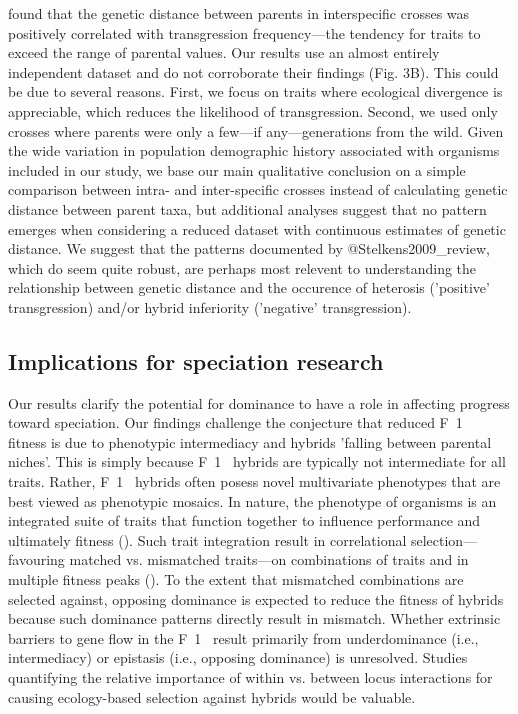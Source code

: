\documentclass[times, twoside, watermark]{zHenriquesLab-StyleBioRxiv}
\begin{document}
\cite{Stelkens2009_review} found that the genetic distance between parents in interspecific crosses was positively correlated with transgression frequency---the tendency for traits to exceed the range of parental values. Our results use an almost entirely independent dataset and do not corroborate their findings (Fig. 3B). This could be due to several reasons. First, we focus on traits where ecological divergence is appreciable, which reduces the likelihood of transgression. Second, we used only crosses where parents were only a few---if any---generations from the wild. Given the wide variation in population demographic history associated with organisms included in our study, we base our main qualitative conclusion on a simple comparison between intra- and inter-specific crosses instead of calculating genetic distance between parent taxa, but additional analyses suggest that no pattern emerges when considering a reduced dataset with continuous estimates of genetic distance. We suggest that the patterns documented by @Stelkens2009_review, which do seem quite robust, are perhaps most relevent to understanding the relationship between genetic distance and the occurence of heterosis ('positive' transgression) and/or hybrid inferiority ('negative' transgression).\par

\subsection*{Implications for speciation research}
Our results clarify the potential for dominance to have a role in affecting progress toward speciation. Our findings challenge the conjecture that reduced F~1~ fitness is due to phenotypic intermediacy and hybrids 'falling between parental niches'. This is simply because F~1~ hybrids are typically not intermediate for all traits. Rather, F~1~ hybrids often posess novel multivariate phenotypes that are best viewed as phenotypic mosaics. In nature, the phenotype of organisms is an integrated suite of traits that function together to influence performance and ultimately fitness (\citealt{Arnold1983}). Such trait integration result in correlational selection---favouring matched vs. mismatched traits---on combinations of traits and in multiple fitness peaks (\citealt{Brodie1992}). To the extent that mismatched combinations are selected against, opposing dominance is expected to reduce the fitness of hybrids because such dominance patterns directly result in mismatch. Whether extrinsic barriers to gene flow in the F~1~ result primarily from underdominance (i.e., intermediacy) or epistasis (i.e., opposing dominance) is unresolved. Studies quantifying the relative importance of within vs. between locus interactions for causing ecology-based selection against hybrids would be valuable. \par
\end{document}

